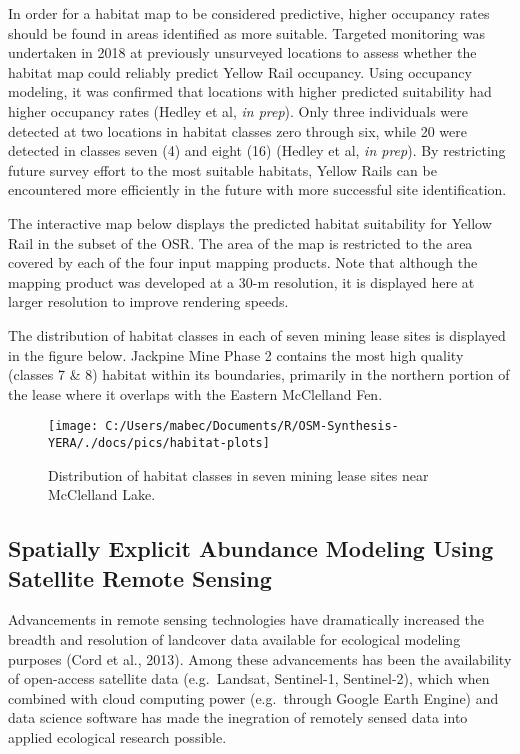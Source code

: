 \documentclass[11pt,]{article}
\begin{document}
In order for a habitat map to be considered predictive, higher occupancy
rates should be found in areas identified as more suitable. Targeted
monitoring was undertaken in 2018 at previously unsurveyed locations to
assess whether the habitat map could reliably predict Yellow Rail
occupancy. Using occupancy modeling, it was confirmed that locations
with higher predicted suitability had higher occupancy rates (Hedley et
al, \emph{in prep}). Only three individuals were detected at two
locations in habitat classes zero through six, while 20 were detected in
classes seven (4) and eight (16) (Hedley et al, \emph{in prep}). By
restricting future survey effort to the most suitable habitats, Yellow
Rails can be encountered more efficiently in the future with more
successful site identification.

The interactive map below displays the predicted habitat suitability for
Yellow Rail in the subset of the OSR. The area of the map is restricted
to the area covered by each of the four input mapping products. Note
that although the mapping product was developed at a 30-m resolution, it
is displayed here at larger resolution to improve rendering speeds.

The distribution of habitat classes in each of seven mining lease sites
is displayed in the figure below. Jackpine Mine Phase 2 contains the
most high quality (classes 7 \& 8) habitat within its boundaries,
primarily in the northern portion of the lease where it overlaps with
the Eastern McClelland Fen.

\begin{figure}[H]

{\centering \texttt{[image: C:/Users/mabec/Documents/R/OSM-Synthesis-YERA/./docs/pics/habitat-plots]} 

}

\caption{Distribution of habitat classes in seven mining lease sites near McClelland Lake.}\label{fig:habitat-plots}
\end{figure}

\subsection{Spatially Explicit Abundance Modeling Using Satellite Remote
Sensing}\label{spatially-explicit-abundance-modeling-using-satellite-remote-sensing}

Advancements in remote sensing technologies have dramatically increased
the breadth and resolution of landcover data available for ecological
modeling purposes (Cord et al., 2013). Among these advancements has been
the availability of open-access satellite data (e.g.~Landsat,
Sentinel-1, Sentinel-2), which when combined with cloud computing power
(e.g.~through Google Earth Engine) and data science software has made
the inegration of remotely sensed data into applied ecological research
possible.
\end{document}
